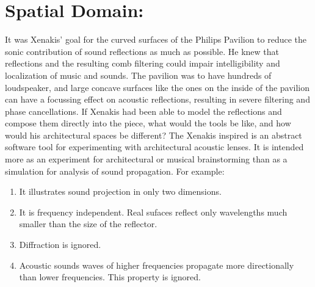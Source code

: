 \chapter{Spatial Domain: }
\label{ch:ref-mod}

It was Xenakis' goal for the curved surfaces of the Philips Pavilion
to reduce the sonic contribution of sound reflections as much as
possible.\cite{philips1958} He knew that reflections and the resulting
comb filtering could impair intelligibility and localization of music
and sounds. The pavilion was to have hundreds of loudspeaker, and
large concave surfaces like the ones on the inside of the pavilion can
have a focussing effect on acoustic reflections, resulting in severe
filtering and phase cancellations.\cite{Vercammen2008} If Xenakis had
been able to model the reflections and compose them directly into the
piece, what would the tools be like, and how would his architectural
spaces be different? The Xenakis inspired  is an abstract
software tool for experimenting with architectural acoustic lenses. It
is intended more as an experiment for architectural or musical
brainstorming than as a simulation for analysis of sound
propagation. For example:
\begin{enumerate}
\item It illustrates sound projection in only two dimensions.
\item It is frequency independent. Real sufaces reflect only
  wavelengths much smaller than the size of the
  reflector.\cite{Zhixin2005} 
\item Diffraction is ignored. 
\item Acoustic sounds waves of higher frequencies propagate more
  directionally than lower frequencies. This property is ignored.
\end{enumerate}


